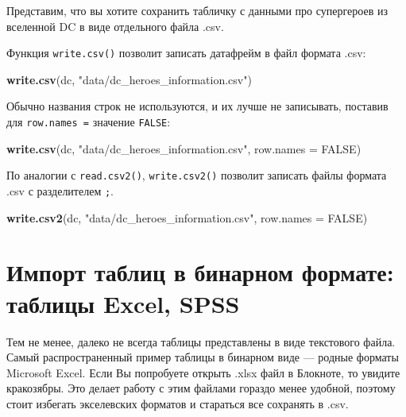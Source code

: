 \documentclass[
]{book}
\newenvironment{Shaded}{\begin{snugshade}}{\end{snugshade}}
\newcommand{\DataTypeTok}[1]{\textcolor[rgb]{0.13,0.29,0.53}{#1}}
\newcommand{\KeywordTok}[1]{\textcolor[rgb]{0.13,0.29,0.53}{\textbf{#1}}}
\newcommand{\NormalTok}[1]{#1}
\newcommand{\OperatorTok}[1]{\textcolor[rgb]{0.81,0.36,0.00}{\textbf{#1}}}
\newcommand{\OtherTok}[1]{\textcolor[rgb]{0.56,0.35,0.01}{#1}}
\newcommand{\StringTok}[1]{\textcolor[rgb]{0.31,0.60,0.02}{#1}}
\begin{document}
Представим, что вы хотите сохранить табличку с данными про супергероев из вселенной DC в виде отдельного файла .csv.

\begin{Shaded}
\end{Shaded}

Функция \texttt{write.csv()} позволит записать датафрейм в файл формата .csv:

\begin{Shaded}
\begin{Highlighting}[]
\KeywordTok{write.csv}\NormalTok{(dc, }\StringTok{"data/dc_heroes_information.csv"}\NormalTok{)}
\end{Highlighting}
\end{Shaded}

Обычно названия строк не используются, и их лучше не записывать, поставив для \texttt{row.names\ =} значение \texttt{FALSE}:

\begin{Shaded}
\begin{Highlighting}[]
\KeywordTok{write.csv}\NormalTok{(dc, }\StringTok{"data/dc_heroes_information.csv"}\NormalTok{, }\DataTypeTok{row.names =} \OtherTok{FALSE}\NormalTok{)}
\end{Highlighting}
\end{Shaded}

По аналогии с \texttt{read.csv2()}, \texttt{write.csv2()} позволит записать файлы формата .csv с разделителем \texttt{;}.

\begin{Shaded}
\begin{Highlighting}[]
\KeywordTok{write.csv2}\NormalTok{(dc, }\StringTok{"data/dc_heroes_information.csv"}\NormalTok{, }\DataTypeTok{row.names =} \OtherTok{FALSE}\NormalTok{)}
\end{Highlighting}
\end{Shaded}

\hypertarget{binary}{%
\section{Импорт таблиц в бинарном формате: таблицы Excel, SPSS}\label{binary}}

Тем не менее, далеко не всегда таблицы представлены в виде текстового файла. Самый распространенный пример таблицы в бинарном виде --- родные форматы Microsoft Excel. Если Вы попробуете открыть .xlsx файл в Блокноте, то увидите кракозябры. Это делает работу с этим файлами гораздо менее удобной, поэтому стоит избегать экселевских форматов и стараться все сохранять в .csv.
\end{document}
